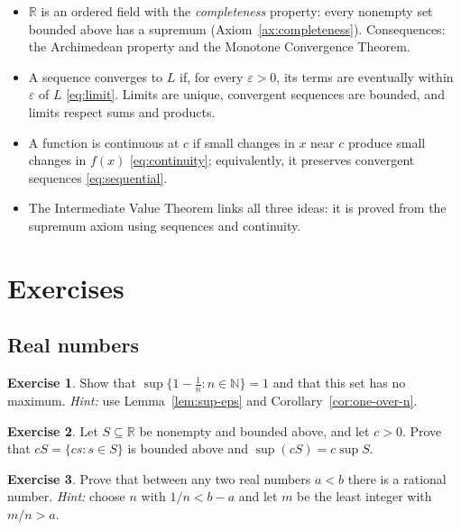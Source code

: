\documentclass[11pt,a4paper]{book}
\newcommand{\N}{\mathbb{N}}
\newcommand{\R}{\mathbb{R}}
\numberwithin{equation}{section}          %
\theoremstyle{plain}
\theoremstyle{definition}
\newtheorem{exercise}{Exercise}[chapter]  %
\theoremstyle{remark}
\begin{document}
\begin{itemize}
    \item $\R$ is an ordered field with the \emph{completeness} property: every nonempty set bounded above has a supremum (Axiom~\ref{ax:completeness}). Consequences: the Archimedean property and the Monotone Convergence Theorem.
    \item A sequence converges to $L$ if, for every $\varepsilon>0$, its terms are eventually within $\varepsilon$ of $L$ \eqref{eq:limit}. Limits are unique, convergent sequences are bounded, and limits respect sums and products.
    \item A function is continuous at $c$ if small changes in $x$ near $c$ produce small changes in $f(x)$ \eqref{eq:continuity}; equivalently, it preserves convergent sequences \eqref{eq:sequential}.
    \item The Intermediate Value Theorem links all three ideas: it is proved from the supremum axiom using sequences and continuity.
\end{itemize}

\section{Exercises}\label{sec:exercises}

\subsection*{Real numbers}

\begin{exercise}
Show that $\sup\{1-\tfrac1n:n\in\N\}=1$ and that this set has no maximum. \emph{Hint:} use Lemma~\ref{lem:sup-eps} and Corollary~\ref{cor:one-over-n}.
\end{exercise}

\begin{exercise}
Let $S\subseteq\R$ be nonempty and bounded above, and let $c>0$. Prove that $cS=\{cs:s\in S\}$ is bounded above and $\sup(cS)=c\sup S$.
\end{exercise}

\begin{exercise}\label{ex:density}
Prove that between any two real numbers $a<b$ there is a rational number. \emph{Hint:} choose $n$ with $1/n<b-a$ and let $m$ be the least integer with $m/n>a$.
\end{exercise}
\end{document}

